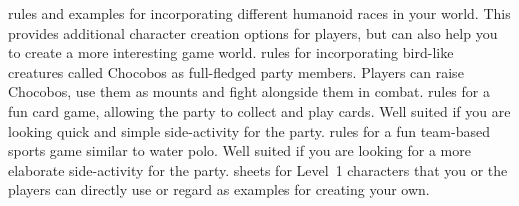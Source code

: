 %
\vfill
%
 rules and examples for incorporating different humanoid races in your world. 
This provides additional character creation options for players, but can also help you to create a more interesting game world.
%
\vfill
%
 rules for incorporating bird-like creatures called Chocobos as full-fledged party members.
Players can raise Chocobos, use them as mounts and fight alongside them in combat.
%
\vfill
%
 rules for a fun card game, allowing the party to collect and play cards.
Well suited if you are looking quick and simple side-activity for the party.
%
\vfill
%
 rules for a fun team-based sports game similar to water polo.
Well suited if you are looking for a more elaborate side-activity for the party.
%
\vfill
%
 sheets for Level~1 characters that you or the players can directly use or regard as examples for creating your own.
%
\clearpage